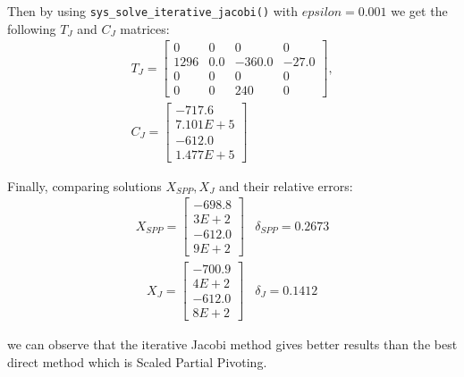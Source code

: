 \documentclass[letterpaper,12pt]{article}
\begin{document}
Then by using \verb|sys_solve_iterative_jacobi()| with $epsilon=0.001$ we get the following $T_J$ and $C_J$ matrices:
\begin{equation}
    \begin{array}{l}
        T_J =
        \begin{bmatrix}
            0      &       0      &       0        &     0\\
            1296   &       0.0    &       -360.0   &     -27.0\\
            0      &       0      &       0        &     0\\
            0      &       0      &       240      &     0 
        \end{bmatrix},\\
        C_J = 
        \begin{bmatrix}
            -717.6\\
            7.101E+5\\
            -612.0\\
            1.477E+5 
        \end{bmatrix}
    \end{array}
\end{equation}

Finally, comparing solutions $X_{SPP}, X_{J}$ and their relative errors:
\begin{equation}
    \begin{array}{ll}
        X_{SPP} =
        \begin{bmatrix}
            -698.8\\
            3E+2\\
            -612.0\\
            9E+2  
        \end{bmatrix} & \delta_{SPP} = 0.2673\\
        \ \ \ \ X_{J} =
        \begin{bmatrix}
            -700.9\\
            4E+2\\
            -612.0\\
            8E+2 
        \end{bmatrix} & \delta_{J} = 0.1412
    \end{array}
\end{equation}

we can observe that the iterative Jacobi method gives better results than the best direct method which is Scaled Partial Pivoting.
\end{document}
